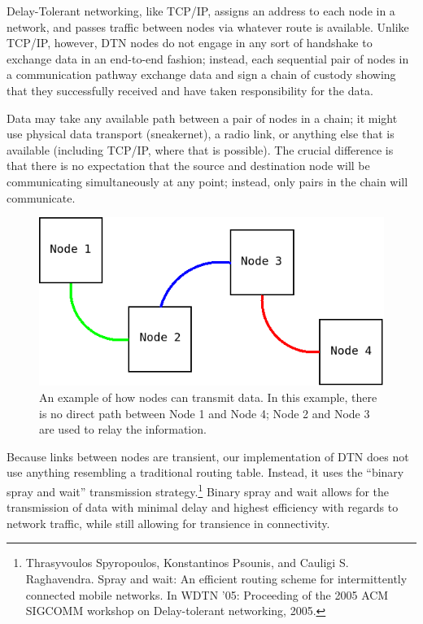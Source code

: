 \documentclass[12pt]{article}
\begin{document}
    Delay-Tolerant networking, like TCP/IP, assigns an address to each node in a network, and passes traffic between nodes via whatever route is available. Unlike TCP/IP, however, DTN nodes do not engage in any sort of handshake to exchange data in an end-to-end fashion; instead, each sequential pair of nodes in a communication pathway exchange data and sign a chain of custody showing that they successfully received and have taken responsibility for the data.
    
    Data may take any available path between a pair of nodes in a chain; it might use physical data transport (sneakernet), a radio link, or anything else that is available (including TCP/IP, where that is possible). The crucial difference is that there is no expectation that the source and destination node will be communicating simultaneously at any point; instead, only pairs in the chain will communicate.
    
    \begin{figure}[h]
      \centering
      \includegraphics[scale=0.5]{Diagram1.png}
      \caption{An example of how nodes can transmit data. In this example, there is no direct path between Node 1 and Node 4; Node 2 and Node 3 are used to relay the information.}
    \end{figure}
    
    Because links between nodes are transient, our implementation of DTN does not use anything resembling a traditional routing table. Instead, it uses the ``binary spray and wait'' transmission strategy.\footnote{Thrasyvoulos Spyropoulos, Konstantinos Psounis, and Cauligi S. Raghavendra. Spray and wait: An efficient routing scheme for intermittently connected mobile networks. In WDTN '05: Proceeding of the 2005 ACM SIGCOMM workshop on Delay-tolerant networking, 2005.} Binary spray and wait allows for the transmission of data with minimal delay and highest efficiency with regards to network traffic, while still allowing for transience in connectivity.
    
\end{document}
